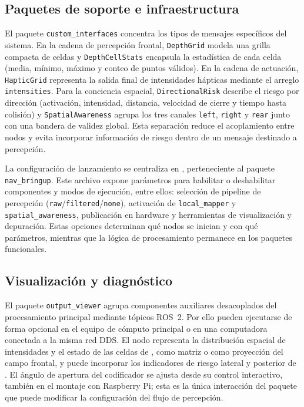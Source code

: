 \subsection{Paquetes de soporte e infraestructura}
\label{sec:arq-soporte}

El paquete \texttt{custom\_interfaces} concentra los tipos de mensajes específicos del sistema.
En la cadena de percepción frontal, \texttt{DepthGrid} modela una grilla compacta de celdas y
\texttt{DepthCellStats} encapsula la estadística de cada celda (media, mínimo, máximo y conteo
de puntos válidos). En la cadena de actuación, \texttt{HapticGrid} representa la salida final de
intensidades hápticas mediante el arreglo \texttt{intensities}. Para la conciencia espacial,
\texttt{DirectionalRisk} describe el riesgo por dirección (activación, intensidad, distancia,
velocidad de cierre y tiempo hasta colisión) y \texttt{SpatialAwareness} agrupa los tres canales
\texttt{left}, \texttt{right} y \texttt{rear} junto con una bandera de validez global. Esta
separación reduce el acoplamiento entre nodos y evita incorporar información de riesgo dentro de un
mensaje destinado a percepción.

La configuración de lanzamiento se centraliza en , perteneciente al paquete
\texttt{nav\_bringup}. Este archivo expone parámetros para habilitar o deshabilitar componentes y
modos de ejecución, entre ellos: selección de pipeline de percepción
(\texttt{raw}/\texttt{filtered}/\texttt{none}), activación de \texttt{local\_mapper} y
\texttt{spatial\_awareness}, publicación en hardware y
herramientas de visualización y depuración. Estas opciones determinan qué nodos se inician y con
qué parámetros, mientras que la lógica de procesamiento permanece en los paquetes funcionales.

\subsection{Visualización y diagnóstico}
\label{sec:arq-viz}

El paquete \texttt{output\_viewer} agrupa componentes auxiliares desacoplados del procesamiento
principal mediante tópicos ROS~2. Por ello pueden ejecutarse de forma opcional en el equipo de
cómputo principal o en una computadora conectada a la misma red DDS. El nodo
 representa la distribución espacial de intensidades y el estado de las
celdas de , como matriz o como proyección del campo frontal, y puede
incorporar los indicadores de riesgo lateral y posterior de
. El ángulo de apertura del codificador se ajusta
desde su control interactivo, también en el montaje con Raspberry Pi; esta es la única
interacción del paquete que puede modificar la configuración del flujo de percepción.

